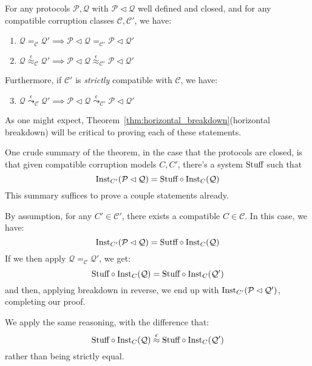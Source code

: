 \begin{theorem}
  \label{thm:horizontal_composition_theorem}
  For any protocols $\mathcal{P}, \mathcal{Q}$ with $\mathcal{P} \lhd \mathcal{Q}$
  well defined and closed, and for any compatible corruption classes $\mathcal{C}, \mathcal{C'}$, we have:
  \begin{enumerate}
    \item $\mathcal{Q} =_{\mathcal{C}} \mathcal{Q}' \implies \mathcal{P} \lhd \mathcal{Q} =_{\mathcal{C}'} \mathcal{P} \lhd \mathcal{Q}'$
    \item $\mathcal{Q} \overset{\epsilon}{\approx}_{\mathcal{C}} \mathcal{Q}' \implies \mathcal{P} \lhd \mathcal{Q} \overset{\epsilon}{\approx}_{\mathcal{C}'} \mathcal{P} \lhd \mathcal{Q}'$
  \end{enumerate}

  Furthermore, if $\mathcal{C}'$ is \emph{strictly} compatible with $\mathcal{C}$,
  we have:
  \begin{enumerate}
    \setcounter{enumi}{2}
    \item $\mathcal{Q} \overset{\epsilon}{\leadsto}_{\mathcal{C}} \mathcal{Q}' \implies \mathcal{P} \lhd \mathcal{Q} \overset{\epsilon}{\leadsto}_{\mathcal{C}'} \mathcal{P} \lhd \mathcal{Q}'$
  \end{enumerate}

   As one might expect,
  Theorem~\ref{thm:horizontal_breakdown}(horizontal breakdown)
  will be critical to proving each of these statements.

  One crude summary of the theorem, in the case
  that the protocols are closed, is that given compatible
  corruption models $C, C'$, there's a system $\text{Stuff}$ such that
  $$
  \text{Inst}_{C'}(\mathcal{P} \lhd \mathcal{Q}) = \text{Stuff} \circ \text{Inst}_C(\mathcal{Q})
  $$
  This summary suffices to prove a couple statements already.

   By assumption, for any $C' \in \mathcal{C}'$,
  there exists a compatible $C \in \mathcal{C}$.
  In this case, we have:
  $$
  \text{Inst}_{C'}(\mathcal{P} \lhd \mathcal{Q}) = \text{Sutff} \circ \text{Inst}_C(\mathcal{Q})
  $$
  If we then apply $\mathcal{Q} =_{\mathcal{C}} \mathcal{Q}'$,
  we get:
  $$
  \text{Stuff} \circ \text{Inst}_C(\mathcal{Q}) = \text{Stuff} \circ \text{Inst}_C(\mathcal{Q}')
  $$
  and then, applying breakdown in reverse, we end up with $\text{Inst}_{C'}(\mathcal{P} \lhd \mathcal{Q}')$,
  completing our proof.

   We apply the same reasoning, with the difference that:
  $$
  \text{Stuff} \circ \text{Inst}_C(\mathcal{Q}) \overset{\epsilon}{\approx} \text{Stuff} \circ \text{Inst}_C(\mathcal{Q}')
  $$
  rather than being strictly equal.


\end{theorem}
